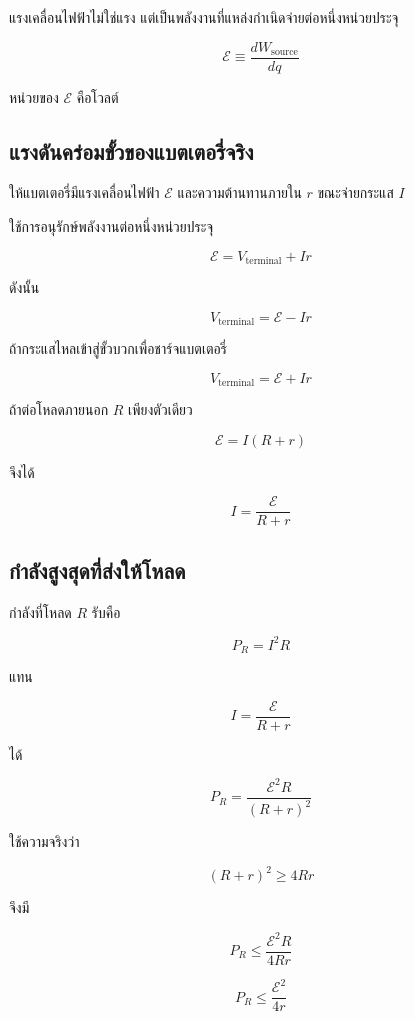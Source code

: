 แรงเคลื่อนไฟฟ้าไม่ใช่แรง แต่เป็นพลังงานที่แหล่งกำเนิดจ่ายต่อหนึ่งหน่วยประจุ

\begin{tcolorbox}[title={นิยามแรงเคลื่อนไฟฟ้า}]
\[
\boxed{\mathcal{E}\equiv\frac{dW_{\text{source}}}{dq}}
\]
\end{tcolorbox}

หน่วยของ $\mathcal{E}$ คือโวลต์

\subsection{แรงดันคร่อมขั้วของแบตเตอรี่จริง}

ให้แบตเตอรี่มีแรงเคลื่อนไฟฟ้า $\mathcal{E}$ และความต้านทานภายใน $r$ ขณะจ่ายกระแส $I$

ใช้การอนุรักษ์พลังงานต่อหนึ่งหน่วยประจุ

\[
\mathcal{E}=V_{\text{terminal}}+Ir
\]

ดังนั้น

\begin{tcolorbox}[title={แบตเตอรี่กำลังจ่ายกระแส}]
\[
\boxed{V_{\text{terminal}}=\mathcal{E}-Ir}
\]
\end{tcolorbox}

ถ้ากระแสไหลเข้าสู่ขั้วบวกเพื่อชาร์จแบตเตอรี่

\[
\boxed{V_{\text{terminal}}=\mathcal{E}+Ir}
\]

ถ้าต่อโหลดภายนอก $R$ เพียงตัวเดียว

\[
\mathcal{E}=I(R+r)
\]

จึงได้

\[
\boxed{I=\frac{\mathcal{E}}{R+r}}
\]

\subsection{กำลังสูงสุดที่ส่งให้โหลด}

กำลังที่โหลด $R$ รับคือ

\[
P_R=I^2R
\]

แทน

\[
I=\frac{\mathcal{E}}{R+r}
\]

ได้

\[
P_R=\frac{\mathcal{E}^2R}{(R+r)^2}
\]

ใช้ความจริงว่า

\[
(R+r)^2\geq 4Rr
\]

จึงมี

\[
P_R\leq\frac{\mathcal{E}^2R}{4Rr}
\]

\[
P_R\leq\frac{\mathcal{E}^2}{4r}
\]

